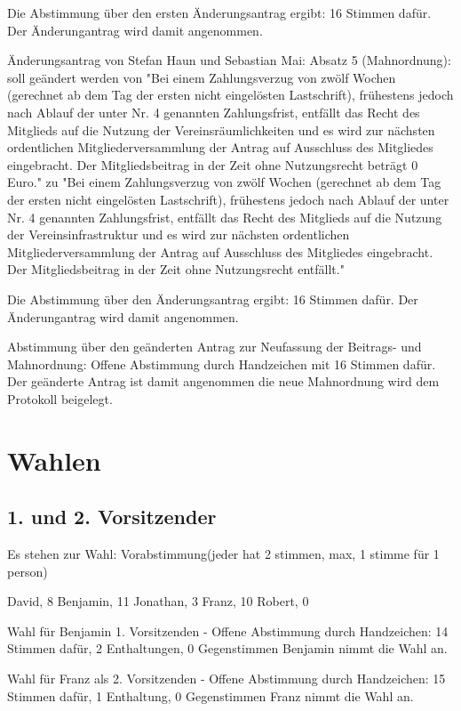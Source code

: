 \documentclass[a4paper,12pt,titlepage]{scrartcl}
\begin{document}
Die Abstimmung über den ersten Änderungsantrag ergibt: 16 Stimmen dafür. Der Änderungantrag wird damit angenommen.

Änderungsantrag von Stefan Haun und Sebastian Mai: 
Absatz 5 (Mahnordnung): soll geändert werden von 
"Bei einem Zahlungsverzug von zwölf Wochen (gerechnet ab dem Tag der ersten nicht
eingelösten Lastschrift), frühestens jedoch nach Ablauf der unter Nr. 4 genannten
Zahlungsfrist, entfällt das Recht des Mitglieds auf die Nutzung der
Vereinsräumlichkeiten und es wird zur nächsten ordentlichen Mitgliederversammlung
der Antrag auf Ausschluss des Mitgliedes eingebracht. Der Mitgliedsbeitrag in der Zeit
ohne Nutzungsrecht beträgt 0 Euro." zu 
"Bei einem Zahlungsverzug von zwölf Wochen (gerechnet ab dem Tag der ersten nicht
eingelösten Lastschrift), frühestens jedoch nach Ablauf der unter Nr. 4 genannten
Zahlungsfrist, entfällt das Recht des Mitglieds auf die Nutzung der
Vereinsinfrastruktur und es wird zur nächsten ordentlichen Mitgliederversammlung
der Antrag auf Ausschluss des Mitgliedes eingebracht. Der Mitgliedsbeitrag in der Zeit ohne Nutzungsrecht entfällt."


Die Abstimmung über den Änderungsantrag ergibt: 16 Stimmen dafür. Der Änderungantrag wird damit angenommen.


Abstimmung über den geänderten Antrag zur Neufassung der Beitrags- und Mahnordnung: Offene Abstimmung durch Handzeichen mit 16 Stimmen dafür. Der geänderte Antrag ist damit angenommen die neue Mahnordnung wird dem Protokoll beigelegt.


\section{Wahlen}

\subsection{ 1. und 2. Vorsitzender }
Es stehen zur Wahl: 
    Vorabstimmung(jeder hat 2 stimmen, max, 1 stimme für 1 person)
    
    David, 8
    Benjamin, 11
    Jonathan, 3
    Franz, 10
    Robert, 0
    
    Wahl für Benjamin 1. Vorsitzenden
    - Offene Abstimmung durch Handzeichen: 14 Stimmen dafür, 2 Enthaltungen, 0 Gegenstimmen
    Benjamin nimmt die Wahl an.
    
    Wahl für Franz als 2. Vorsitzenden
    - Offene Abstimmung durch Handzeichen: 15 Stimmen dafür, 1 Enthaltung, 0 Gegenstimmen
    Franz nimmt die Wahl an.
\end{document}
